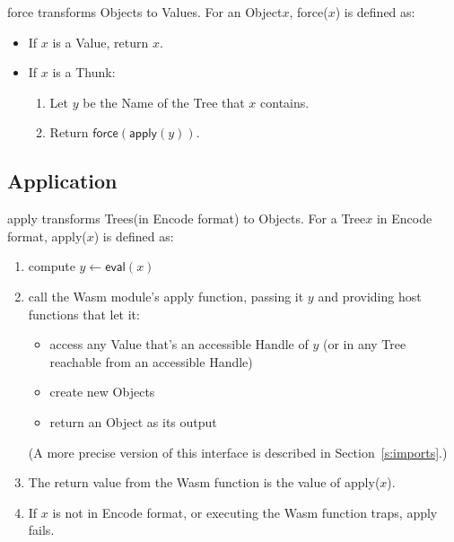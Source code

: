 \documentclass{article}
\newcommand{\valuex}{\textrm{Value}\xspace}
\newcommand{\valuexs}{\textrm{Value}s\xspace}
\newcommand{\object}{\textrm{Object}\xspace}
\newcommand{\objects}{\textrm{Object}s\xspace}
\newcommand{\encode}{\textrm{Encode}\xspace}
\newcommand{\thunk}{\textrm{Thunk}\xspace}
\newcommand{\name}{\textrm{Name}\xspace}
\newcommand{\tree}{\textrm{Tree}\xspace}
\newcommand{\trees}{\textrm{Tree}s\xspace}
\newcommand{\handle}{\textrm{Handle}\xspace}
\newcommand{\eval}{\textsf{eval}}
\newcommand{\apply}{\textsf{apply}}
\newcommand{\force}{\textsf{force}}
\begin{document}
\force{} transforms \objects to \valuexs.  For an \object $x$, \force($x$) is defined as:
\begin{itemize}[itemsep=0pt]
\item If $x$ is a \valuex, return $x$.

\item If $x$ is a \thunk:
  \begin{enumerate}[topsep=0pt,itemsep=0pt]
  \item Let $y$ be the \name of the \tree that $x$ contains.
  \item Return $\force(\apply(y))$.
  \end{enumerate}
\end{itemize}

\subsection{Application}

\apply{} transforms \trees (in \encode format) to \objects. For a \tree $x$ in \encode format, \apply($x$) is defined as:

\begin{enumerate}[itemsep=0pt]
\item compute $y \leftarrow \eval(x)$
\item call the Wasm module's apply function, passing it $y$ and providing host functions that let it:
  \begin{itemize}[topsep=0pt, itemsep=0pt]
  \item access any \valuex that's an accessible \handle of $y$ (or in any \tree reachable from an accessible \handle)
  \item create new \objects
  \item return an \object as its output
  \end{itemize}
  (A more precise version of this interface is described in Section~\ref{s:imports}.)
\item The return value from the Wasm function is the value of \apply($x$).
\item If $x$ is not in \encode format, or executing the Wasm function traps, \apply{} fails.
\end{enumerate}
      
\end{document}
